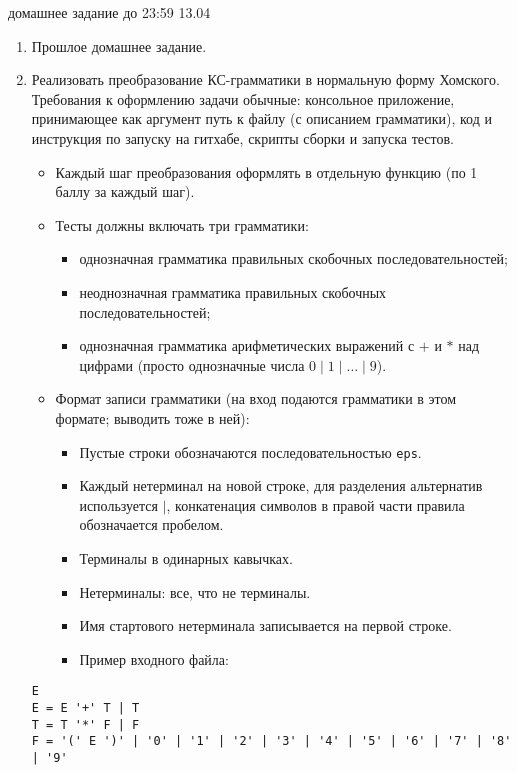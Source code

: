 \documentclass[12pt]{article}
\begin{document}

{\Large домашнее задание до 23:59 13.04}
\bigskip

\begin{enumerate}
  \item Прошлое домашнее задание.
  \item Реализовать преобразование КС-грамматики в нормальную форму Хомского. Требования к оформлению задачи обычные: консольное приложение, принимающее как аргумент путь к файлу (с описанием грамматики), код и инструкция по запуску на гитхабе, скрипты сборки и запуска тестов.
  \begin{itemize}
      \item Каждый шаг преобразования оформлять в отдельную функцию (по 1 баллу за каждый шаг).
      \item Тесты должны включать три грамматики:
      \begin{itemize}
          \item однозначная грамматика правильных скобочных последовательностей;
          \item неоднозначная грамматика правильных скобочных последовательностей;
          \item однозначная грамматика арифметических выражений с $+$ и $*$ над цифрами (просто однозначные числа $0 \;|\; 1 \;|\; \dots \;|\; 9$).
      \end{itemize} 
      \item Формат записи грамматики (на вход подаются грамматики в этом формате; выводить тоже в ней): 
      \begin{itemize}
          \item Пустые строки обозначаются последовательностью \verb!eps!.
          \item Каждый нетерминал на новой строке, для разделения альтернатив используется $|$, конкатенация символов в правой части правила обозначается пробелом.
          \item Терминалы в одинарных кавычках.
          \item Нетерминалы: все, что не терминалы.
          \item Имя стартового нетерминала записывается на первой строке.
          \item Пример входного файла:
      \end{itemize}
  \end{itemize}

\begin{verbatim}
E
E = E '+' T | T
T = T '*' F | F
F = '(' E ')' | '0' | '1' | '2' | '3' | '4' | '5' | '6' | '7' | '8' | '9'
\end{verbatim}


\end{enumerate}
\end{document}
